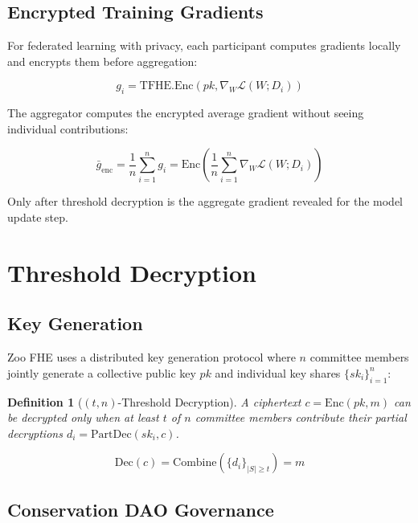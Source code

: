 \documentclass[11pt,letterpaper]{article}
\newtheorem{definition}{Definition}[section]
\begin{document}
\subsection{Encrypted Training Gradients}

For federated learning with privacy, each participant computes gradients locally and encrypts them before aggregation:

\begin{equation}
g_i = \text{TFHE.Enc}(pk, \nabla_W \mathcal{L}(W; D_i))
\end{equation}

The aggregator computes the encrypted average gradient without seeing individual contributions:

\begin{equation}
\bar{g}_{\text{enc}} = \frac{1}{n} \sum_{i=1}^n g_i = \text{Enc}\left(\frac{1}{n} \sum_{i=1}^n \nabla_W \mathcal{L}(W; D_i)\right)
\end{equation}

Only after threshold decryption is the aggregate gradient revealed for the model update step.

\section{Threshold Decryption}
\label{sec:threshold}

\subsection{Key Generation}

Zoo FHE uses a distributed key generation protocol where $n$ committee members jointly generate a collective public key $pk$ and individual key shares $\{sk_i\}_{i=1}^n$:

\begin{definition}[$(t, n)$-Threshold Decryption]
A ciphertext $c = \text{Enc}(pk, m)$ can be decrypted only when at least $t$ of $n$ committee members contribute their partial decryptions $d_i = \text{PartDec}(sk_i, c)$.
\end{definition}

\begin{equation}
\text{Dec}(c) = \text{Combine}(\{d_i\}_{|S| \geq t}) = m
\end{equation}

\subsection{Conservation DAO Governance}
\end{document}
